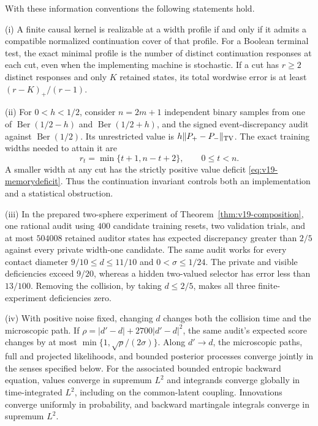 \begin{theorem}
\label{thm:v19-main}
With these information conventions the following statements hold.

\smallskip\noindent
\textup{(i)} A finite causal kernel is realizable at a width profile if
and only if it admits a compatible normalized continuation cover of that
profile. For a Boolean terminal test, the exact minimal profile is the
number of distinct continuation responses at each cut, even when the
implementing machine is stochastic. If a cut has $r\ge2$ distinct
responses and only $K$ retained states, its total wordwise error is at
least $(r-K)_+/(r-1)$.

\smallskip\noindent
\textup{(ii)} For $0<h<1/2$, consider $n=2m+1$ independent binary samples from one of
$\operatorname{Ber}(1/2-h)$ and $\operatorname{Ber}(1/2+h)$, and the
signed event-discrepancy audit against $\operatorname{Ber}(1/2)$. Its
unrestricted value is $h\|P_+-P_-\|_{\rm TV}$. The exact training widths
needed to attain it are
\[
 r_t=\min\{t+1,n-t+2\},\qquad 0\le t<n.
\]
A smaller width at any cut has the strictly positive value deficit
\eqref{eq:v19-memorydeficit}. Thus the continuation invariant controls
both an implementation and a statistical obstruction.

\smallskip\noindent
\textup{(iii)} In the prepared two-sphere experiment of
Theorem~\ref{thm:v19-composition}, one rational audit using $400$ candidate
training resets, two validation trials, and at most $504008$ retained
auditor states has expected discrepancy greater than $2/5$ against every
private width-one candidate. The same audit works for every contact
diameter $9/10\le d\le11/10$ and $0<\sigma\le1/24$. The private and
visible deficiencies exceed $9/20$, whereas a hidden two-valued selector
has error less than $13/100$. Removing the collision, by taking $d\le2/5$,
makes all three finite-experiment deficiencies zero.

\smallskip\noindent
\textup{(iv)} With positive noise fixed, changing $d$ changes both the
collision time and the microscopic path. If
$\rho=|d'-d|+2700|d'-d|^2$, the same audit's expected score changes by at
most $\min\{1,\sqrt\rho/(2\sigma)\}$. Along $d'\to d$, the microscopic
paths, full and projected likelihoods, and bounded posterior processes
converge jointly in the senses specified below. For the associated bounded
entropic backward equation, values converge in supremum $L^2$ and
integrands converge globally in time-integrated $L^2$, including on the
common-latent coupling. Innovations converge uniformly in probability,
and backward martingale integrals converge in supremum $L^2$.
\end{theorem}

